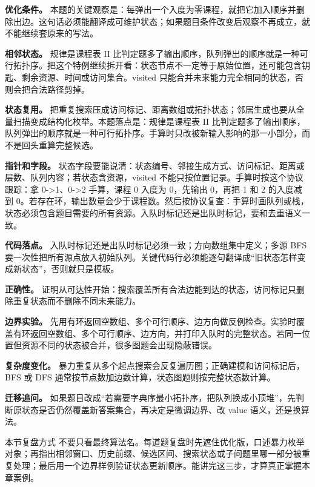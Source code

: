 \textbf{优化条件。} 本题的关键观察是：每弹出一个入度为零课程，就把它加入顺序并删除出边。这句话必须能翻译成可维护状态；如果题目条件改变后观察不再成立，就不能继续套原来的写法。

\textbf{相邻状态。} 规律是课程表 II 比判定题多了输出顺序，队列弹出的顺序就是一种可行拓扑序。把这个特例继续拆开看：状态节点不一定等于原始位置，还可能包含钥匙、剩余资源、时间或访问集合。visited 只能合并未来能力完全相同的状态，否则会把合法路径剪掉。

\textbf{状态复用。} 把重复搜索压成访问标记、距离数组或拓扑状态；邻居生成也要从全量扫描变成结构化枚举。本题落点是：规律是课程表 II 比判定题多了输出顺序，队列弹出的顺序就是一种可行拓扑序。手算时只改被新输入影响的那一小部分，而不是回头重算完整候选。

\textbf{指针和字段。} 状态字段要能说清：状态编号、邻接生成方式、访问标记、距离或层数、队列内容；若状态含资源，visited 不能只按位置记录。手算时按这个协议跟踪：拿 0->1、0->2 手算，课程 0 入度为 0，先输出 0，再把 1 和 2 的入度减到 0。若存在环，输出数量会少于课程数。然后按协议复查：手算时画队列或栈，状态必须包含题目需要的所有资源。入队时标记还是出队时标记，要和去重语义一致。

\textbf{代码落点。} 入队时标记还是出队时标记必须一致；方向数组集中定义；多源 BFS 要一次性把所有源点放入初始队列。关键代码行必须能逐句翻译成“旧状态怎样变成新状态”，否则就只是模板。

\textbf{正确性。} 证明从可达性开始：搜索覆盖所有合法边能到达的状态，访问标记只删除重复状态而不删除不同未来能力。

\textbf{边界实验。} 先用有环返回空数组、多个可行顺序、边方向做反例检查。实验时覆盖有环返回空数组、多个可行顺序、边方向，并打印入队时的完整状态。若同一位置但资源不同的状态被合并，很多图题会出现隐蔽错误。

\textbf{复杂度变化。} 暴力重复从多个起点搜索会反复遍历图；正确建模和访问标记后，BFS 或 DFS 通常按节点数加边数计算，状态图题则按完整状态数计算。

\textbf{迁移追问。} 如果题目改成“若需要字典序最小拓扑序，把队列换成小顶堆”，先判断原状态是否仍然覆盖新答案集合，再决定是微调边界、改 value 语义，还是换算法。

\begin{principlebox}{本节复盘方式}
不要只看最终算法名。每道题复盘时先遮住优化版，口述暴力枚举对象；再指出相邻窗口、历史前缀、候选区间、搜索状态或子问题里哪一部分被重复处理；最后用一个边界样例验证状态更新顺序。能讲完这三步，才算真正掌握本章案例。
\end{principlebox}
